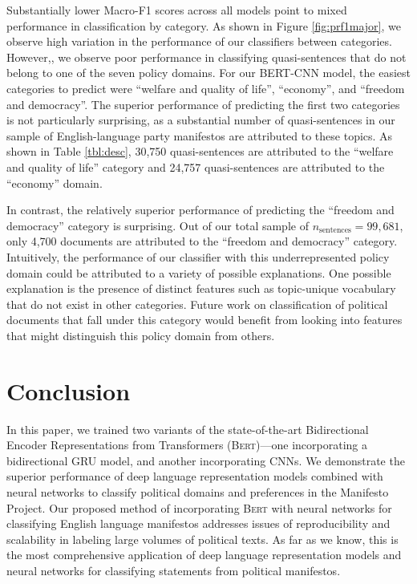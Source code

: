 \documentclass[11pt]{article}
\begin{document}
Substantially lower Macro-F1 scores across all models point to mixed performance in classification by category. As shown in Figure \ref{fig:prf1major}, we observe high variation in the performance of our classifiers between categories. However,, we observe poor performance in classifying quasi-sentences that do not belong to one of the seven policy domains. For our BERT-CNN model, the easiest categories to predict were ``welfare and quality of life'', ``economy'', and ``freedom and democracy''. The superior performance of predicting the first two categories is not particularly surprising, as a substantial number of quasi-sentences in our sample of English-language party manifestos are attributed to these topics. As shown in Table \ref{tbl:desc}, 30,750 quasi-sentences are attributed to the ``welfare and quality of life'' category and 24,757 quasi-sentences are attributed to the ``economy'' domain.


In contrast, the relatively superior performance of predicting the ``freedom and democracy'' category is surprising. Out of our total sample of $n_{\mathrm{sentences}}=99,681$, only 4,700 documents are attributed to the ``freedom and democracy'' category. Intuitively, the performance of our classifier with this underrepresented policy domain could be attributed to a variety of possible explanations. One possible explanation is the presence of distinct features such as topic-unique vocabulary that do not exist in other categories. Future work on classification of political documents that fall under this category would benefit from looking into features that might distinguish this policy domain from others.

\section{Conclusion}
\label{conclusion}

In this paper, we trained two variants of the state-of-the-art Bidirectional Encoder Representations from Transformers (\textsc{Bert})---one incorporating a bidirectional GRU model, and another incorporating CNNs. We demonstrate the superior performance of deep language representation models combined with neural networks to classify political domains and preferences in the Manifesto Project. Our proposed method of incorporating \textsc{Bert} with neural networks for classifying English language manifestos addresses issues of reproducibility and scalability in labeling large volumes of political texts. As far as we know, this is the most comprehensive application of deep language representation models and neural networks for classifying statements from political manifestos.
\end{document}
